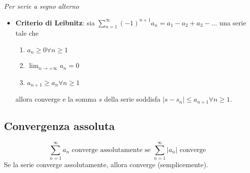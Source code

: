 \documentclass[12pt, a4paper]{article}
\begin{document}
        \textit{Per serie a segno alterno}
        \begin{itemize}
            \item \textbf{Criterio di Leibnitz}: sia $\sum_{n=1}^{\infty}(-1)^{n+1}a_n = a_1-a_2+a_3-\ldots$ una serie tale che
                \begin{enumerate}
                    \item $a_n\geq 0\forall n\geq 1$
                    \item $\lim_{n\rightarrow+\infty}a_n=0$
                    \item $a_{n+1}\geq a_n \forall n\geq 1$
                \end{enumerate}
                allora converge e la somma $s$ della serie soddisfa $\left|s-s_n\right|\leq a_{n+1}\forall n\geq 1$.
        \end{itemize}
    \subsection{Convergenza assoluta}
        \begin{equation*}
            \sum_{n=1}^{\infty}a_n \text{ converge assolutamente se } \sum_{n=1}^{\infty}\left|a_n\right| \text{ converge}
        \end{equation*}
        Se la serie converge assolutamente, allora converge (semplicemente).
\end{document}
